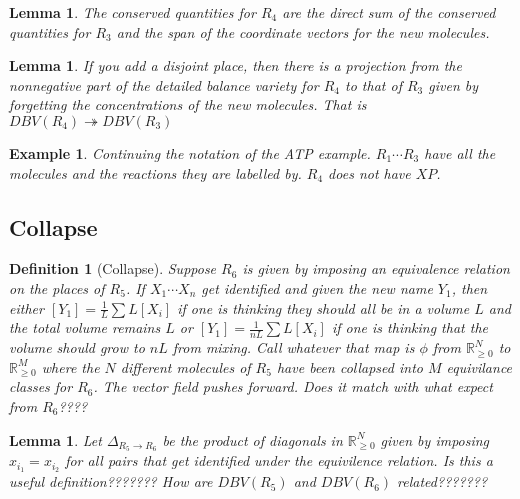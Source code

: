 \documentclass[11pt]{book}
\theoremstyle{change}
\newtheorem{definition}[equation]{Definition}
\newtheorem{lemma}[equation]{Lemma}
\newtheorem{example}[equation]{Example}
\theoremstyle{nonumberplain}
\numberwithin{equation}{section}
\begin{document}
\begin{lemma}
The conserved quantities for $R_4$ are the direct sum of the conserved quantities for $R_3$ and the span of the coordinate vectors for the new molecules.
\end{lemma}

\begin{lemma}
If you add a disjoint place, then there is a projection from the nonnegative part of the detailed balance variety for $R_4$ to that of $R_3$ given by forgetting the concentrations of the new molecules. That is $DBV(R_4) \twoheadrightarrow DBV(R_3)$
\end{lemma}

\begin{example}

Continuing the notation of the ATP example. $R_1 \cdots R_3$ have all the molecules and the reactions they are labelled by. $R_4$ does not have $XP$.

\end{example}

\subsection{Collapse}

\begin{definition}[Collapse]
Suppose $R_6$ is given by imposing an equivalence relation on the places of $R_5$. If $X_1 \cdots X_n$ get identified and given the new name $Y_1$, then either $[Y_1] = \frac{1}{L} \sum L [X_i]$ if one is thinking they should all be in a volume $L$ and the total volume remains $L$ or $[Y_1] = \frac{1}{nL} \sum L [X_i]$ if one is thinking that the volume should grow to $nL$ from mixing. Call whatever that map is $\phi$ from $\mathbb{R}_{\geq 0}^N$ to $\mathbb{R}_{\geq 0}^{M}$ where the $N$ different molecules of $R_5$ have been collapsed into $M$ equivilance classes for $R_6$. The vector field pushes forward. Does it match with what expect from $R_6$????
\end{definition}

\begin{lemma}
Let $\Delta_{R_5 \to R_6}$ be the product of diagonals in $\mathbb{R}_{\geq 0}^N$ given by imposing $x_{i_1} = x_{i_2}$ for all pairs that get identified under the equivilence relation. Is this a useful definition???????
How are $DBV(R_5)$ and $DBV(R_6)$ related???????
\end{lemma}
\end{document}

